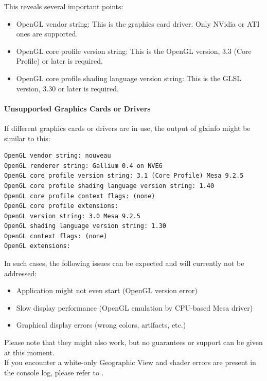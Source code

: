 This reveals several important points:

\begin{itemize}
\item OpenGL vendor string: This is the graphics card driver. Only NVidia or ATI ones are supported.
\item OpenGL core profile version string: This is the OpenGL version, 3.3 (Core Profile) or later is required.
\item OpenGL core profile shading language version string: This is the GLSL version, 3.30 or later is required.
\end{itemize}

\paragraph{Unsupported Graphics Cards or Drivers}

If different graphics cards or drivers are in use, the output of glxinfo might be similar to this:

\begin{lstlisting}
OpenGL vendor string: nouveau
OpenGL renderer string: Gallium 0.4 on NVE6
OpenGL core profile version string: 3.1 (Core Profile) Mesa 9.2.5
OpenGL core profile shading language version string: 1.40
OpenGL core profile context flags: (none)
OpenGL core profile extensions:
OpenGL version string: 3.0 Mesa 9.2.5
OpenGL shading language version string: 1.30
OpenGL context flags: (none)
OpenGL extensions:
\end{lstlisting}


In such cases, the following issues can be expected and will currently not be addressed:

\begin{itemize} 
\item Application might not even start (OpenGL version error)
\item Slow display performance (OpenGL emulation by CPU-based Mesa driver)
\item Graphical display errors (wrong colors, artifacts, etc.) 
\end{itemize} 

Please note that they might also work, but no guarantees or support can be given at this moment. \\

If you encounter a white-only Geographic View and shader errors are present in the console log, please refer to .


